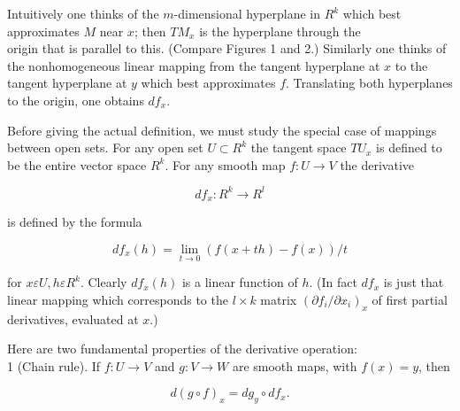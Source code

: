 \documentclass[10pt, letterpaper]{article}
\begin{document}
Intuitively one thinks of the $m$-dimensional hyperplane in $R^{k}$ which best approximates $M$ near $x$; then $T M_{x}$ is the hyperplane through the\\
origin that is parallel to this. (Compare Figures 1 and 2.) Similarly one thinks of the nonhomogeneous linear mapping from the tangent hyperplane at $x$ to the tangent hyperplane at $y$ which best approximates $f$. Translating both hyperplanes to the origin, one obtains $d f_{x}$.

Before giving the actual definition, we must study the special case of mappings between open sets. For any open set $U \subset R^{k}$ the tangent space $T U_{x}$ is defined to be the entire vector space $R^{k}$. For any smooth map $f: U \rightarrow V$ the derivative

$$
d f_{x}: R^{k} \rightarrow R^{l}
$$

is defined by the formula

$$
d f_{x}(h)=\lim _{t \rightarrow 0}(f(x+t h)-f(x)) / t
$$

for $x \varepsilon U, h \varepsilon R^{k}$. Clearly $d f_{x}(h)$ is a linear function of $h$. (In fact $d f_{x}$ is just that linear mapping which corresponds to the $l \times k$ matrix $\left(\partial f_{i} / \partial x_{i}\right)_{x}$ of first partial derivatives, evaluated at $x$.)

Here are two fundamental properties of the derivative operation:\\
1 (Chain rule). If $f: U \rightarrow V$ and $g: V \rightarrow W$ are smooth maps, with $f(x)=y$, then

$$
d(g \circ f)_{x}=d g_{y} \circ d f_{x} .
$$
\end{document}
